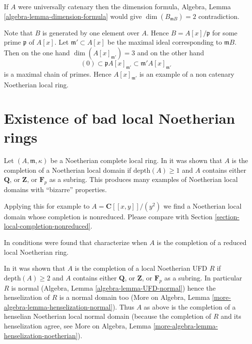 \medskip\noindent
If $A$ were universally catenary then the dimension formula,
Algebra, Lemma \ref{algebra-lemma-dimension-formula}
would give $\dim(B_{\mathfrak mB}) = 2$ contradiction.

\medskip\noindent
Note that $B$ is generated by one element over $A$.
Hence $B = A[x]/\mathfrak p$ for some prime
$\mathfrak p$ of $A[x]$. Let $\mathfrak m' \subset A[x]$ be
the maximal ideal corresponding to $\mathfrak mB$. Then on
the one hand $\dim(A[x]_{\mathfrak m'}) = 3$ and on the
other hand
$$
(0)
\subset \mathfrak pA[x]_{\mathfrak m'}
\subset \mathfrak m'A[x]_{\mathfrak m'}
$$
is a maximal chain of primes. Hence $A[x]_{\mathfrak m'}$ is
an example of a non catenary Noetherian local ring.





\section{Existence of bad local Noetherian rings}
\label{section-bad}

\noindent
Let $(A, \mathfrak m, \kappa)$ be a Noetherian complete local ring.
In \cite{Lech} it was shown that $A$ is the completion of a Noetherian
local domain if $\text{depth}(A) \geq 1$ and $A$ contains either
$\mathbf{Q}$, or $\mathbf{Z}$, or $\mathbf{F}_p$ as a subring.
This produces many examples of Noetherian local domains with
``bizarre'' properties.

\medskip\noindent
Applying this for example to $A = \mathbf{C}[[x, y]]/(y^2)$ we find
a Noetherian local domain whose completion is nonreduced.
Please compare with
Section \ref{section-local-completion-nonreduced}.

\medskip\noindent
In \cite{LLPY} conditions were found that characterize when $A$ is
the completion of a reduced local Noetherian ring.

\medskip\noindent
In \cite{Heitmann-completion-UFD} it was shown that $A$ is the completion
of a local Noetherian UFD $R$ if $\text{depth}(A) \geq 2$ and $A$ contains
either $\mathbf{Q}$, or $\mathbf{Z}$, or $\mathbf{F}_p$ as a subring.
In particular $R$ is normal (Algebra, Lemma \ref{algebra-lemma-UFD-normal})
hence the henselization of $R$ is a normal domain too
(More on Algebra, Lemma \ref{more-algebra-lemma-henselization-normal}).
Thus $A$ as above is the completion of a henselian Noetherian local
normal domain (because the completion of $R$ and its henselization agree,
see More on Algebra, Lemma \ref{more-algebra-lemma-henselization-noetherian}).


